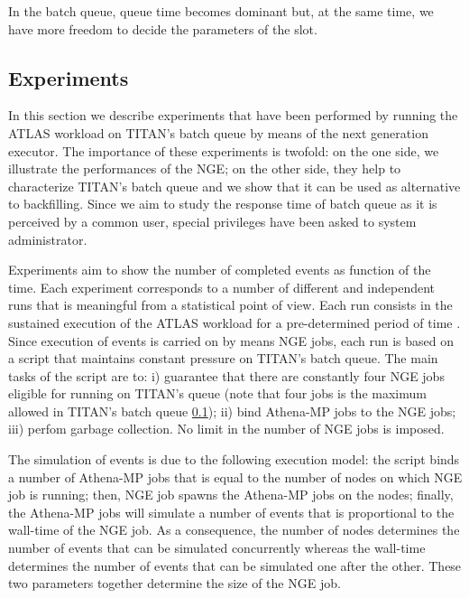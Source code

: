 In the batch queue,  queue time becomes dominant but, at the same time, we have more freedom to decide the parameters of the slot.

\subsection{Experiments}

In this section we describe experiments that have been performed by running the ATLAS workload on TITAN's batch queue by means of the next generation executor.   
The importance of these experiments is twofold: on the one side, we illustrate the performances of the NGE; on the other side, they help to characterize TITAN's batch queue and we show that it can be used as alternative to backfilling. Since we aim to study the response time of batch queue as it is perceived by a common user,  special privileges have been asked to system administrator.

Experiments aim to show the number of completed events as function of the time. 
Each experiment corresponds to a number of different and independent runs that is meaningful from a statistical point of view. Each run consists in the sustained execution of the ATLAS workload for a pre-determined period of time . Since execution of events is carried on by means NGE jobs, each run is based on a script that maintains constant pressure on TITAN's batch queue.
The main tasks of the script are to:  i) guarantee that there are constantly four NGE jobs eligible for running on TITAN's queue (note that four jobs is the maximum allowed in TITAN's batch queue \ref{}); ii)  bind Athena-MP jobs to the NGE jobs; iii) perfom garbage collection. No limit in the number of NGE jobs is imposed.

The simulation of events is due to the following execution model: the script binds a number of Athena-MP jobs that is equal to the number of nodes on which NGE job is running; then, NGE job spawns the Athena-MP jobs on the nodes; finally, the Athena-MP jobs will simulate a number of events that is proportional to the wall-time of the NGE job. As a consequence, the number of nodes determines the number of events that can be simulated concurrently whereas the wall-time determines the number of events that can be simulated one after the other. These two parameters together determine the size of the NGE job. 

